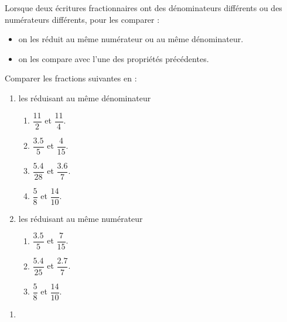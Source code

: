 \begin{methode}
    Lorsque deux écritures fractionnaires ont des dénominateurs différents ou des numérateurs différents, pour les comparer :
    \begin{itemize}
        \item on les réduit au même numérateur ou au même dénominateur.
        \item on les compare avec l'une des propriétés précédentes.
    \end{itemize}
    \exercice
    \begin{spacing}{1.5}
        Comparer les fractions suivantes en :
        \begin{enumerate}
            \item les réduisant au même dénominateur
            \begin{enumerate}
                \item $\dfrac{\num{11 }}{\num{2 }}$ et $\dfrac{\num{11 }}{\num{4 }}$.
                \item $\dfrac{\num{3.5}}{\num{5 }}$ et $\dfrac{\num{4  }}{\num{15}}$.
                \item $\dfrac{\num{5.4}}{\num{28}}$ et $\dfrac{\num{3.6}}{\num{7 }}$.
                \item $\dfrac{\num{5  }}{\num{8 }}$ et $\dfrac{\num{14 }}{\num{10}}$.
            \end{enumerate}
            \item les réduisant au même numérateur
            \begin{enumerate}
                \item $\dfrac{\num{3.5}}{\num{5 }}$ et $\dfrac{\num{7  }}{\num{15}}$.
                \item $\dfrac{\num{5.4}}{\num{25}}$ et $\dfrac{\num{2.7}}{\num{7 }}$.
                \item $\dfrac{\num{5  }}{\num{8 }}$ et $\dfrac{\num{14 }}{\num{10}}$.            
            \end{enumerate}
        \end{enumerate}
    \end{spacing}
    \correction
    \begin{spacing}{1.5}
        \begin{enumerate}
            \item 

\end{enumerate}
\end{spacing}
\end{methode}
